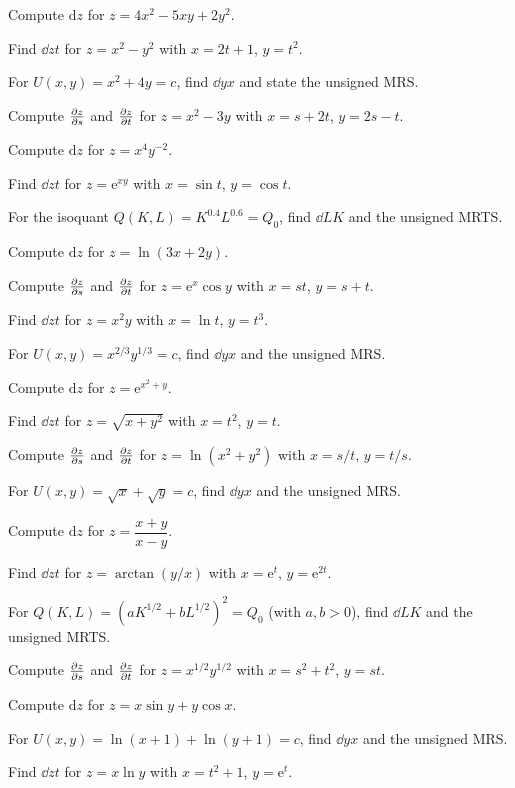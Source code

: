 \begin{problems}
  \item Compute $\mathrm{d}z$ for $z=4x^{2}-5xy+2y^{2}$.
  \item Find $\dd{z}{t}$ for $z=x^{2}-y^{2}$ with $x=2t+1$, $y=t^{2}$.
  \item For $U(x,y)=x^{2}+4y=c$, find $\dd{y}{x}$ and state the unsigned
        MRS.
  \item Compute $\frac{\partial z}{\partial s}$ and $\frac{\partial z}{\partial t}$ for $z=x^{2}-3y$ with
        $x=s+2t$, $y=2s-t$.
  \item Compute $\mathrm{d}z$ for $z=x^{4}y^{-2}$.
  \item Find $\dd{z}{t}$ for $z=\mathrm{e}^{xy}$ with $x=\sin t$,
        $y=\cos t$.
  \item For the isoquant $Q(K,L)=K^{0.4}L^{0.6}=Q_{0}$, find $\dd{L}{K}$
        and the unsigned MRTS.
  \item Compute $\mathrm{d}z$ for $z=\ln(3x+2y)$.
  \item Compute $\frac{\partial z}{\partial s}$ and $\frac{\partial z}{\partial t}$ for $z=\mathrm{e}^{x}\cos y$
        with $x=st$, $y=s+t$.
  \item Find $\dd{z}{t}$ for $z=x^{2}y$ with $x=\ln t$, $y=t^{3}$.
  \item For $U(x,y)=x^{2/3}y^{1/3}=c$, find $\dd{y}{x}$ and the unsigned
        MRS.
  \item Compute $\mathrm{d}z$ for $z=\mathrm{e}^{x^{2}+y}$.
  \item Find $\dd{z}{t}$ for $z=\sqrt{x+y^{2}}$ with $x=t^{2}$, $y=t$.
  \item Compute $\frac{\partial z}{\partial s}$ and $\frac{\partial z}{\partial t}$ for $z=\ln(x^{2}+y^{2})$ with
        $x=s/t$, $y=t/s$.
  \item For $U(x,y)=\sqrt{x}+\sqrt{y}=c$, find $\dd{y}{x}$ and the unsigned
        MRS.
  \item Compute $\mathrm{d}z$ for $z=\dfrac{x+y}{x-y}$.
  \item Find $\dd{z}{t}$ for $z=\arctan(y/x)$ with $x=\mathrm{e}^{t}$,
        $y=\mathrm{e}^{2t}$.
  \item For $Q(K,L)=(aK^{1/2}+bL^{1/2})^{2}=Q_{0}$ (with $a,b>0$), find
        $\dd{L}{K}$ and the unsigned MRTS.
  \item Compute $\frac{\partial z}{\partial s}$ and $\frac{\partial z}{\partial t}$ for $z=x^{1/2}y^{1/2}$ with
        $x=s^{2}+t^{2}$, $y=st$.
  \item Compute $\mathrm{d}z$ for $z=x\sin y+y\cos x$.
  \item For $U(x,y)=\ln(x+1)+\ln(y+1)=c$, find $\dd{y}{x}$ and the
        unsigned MRS.
  \item Find $\dd{z}{t}$ for $z=x\ln y$ with $x=t^{2}+1$, $y=\mathrm{e}^{t}$.

\end{problems}
